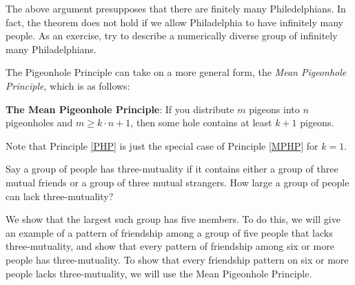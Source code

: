 \begin{aside}
The above argument presupposes that there are finitely many Philedelphians. In fact, the theorem does not hold if we allow Philadelphia to have infinitely many people. As an exercise, try to describe a numerically diverse group of infinitely many Philadelphians. 
\end{aside}

The Pigeonhole Principle can take on a more general form, the \emph{Mean Pigeonhole Principle}, which is as follows:

\begin{principle}\label{MPHP}
\textbf{The Mean Pigeonhole Principle}: If you distribute $m$ pigeons into $n$ pigeonholes and $m\geq k\cdot n +1$, then some hole contains at least $k+1$ pigeons. 
\end{principle}

\begin{aside}
Note that Principle \ref{PHP} is just the special case of Principle \ref{MPHP} for $k=1$.
\end{aside}

\begin{example}
Say a group of people has three-mutuality if it contains either a group of three mutual friends or a group of three mutual strangers. How large a group of people can lack three-mutuality?
\end{example}
We show that the largest such group has five members. To do this, we will give an example of a pattern of friendship among a group of five people that lacks three-mutuality, and show that every pattern of friendship among six or more people has three-mutuality. To show that every friendship pattern on six or more people lacks three-mutuality, we will use the Mean Pigeonhole Principle. 

